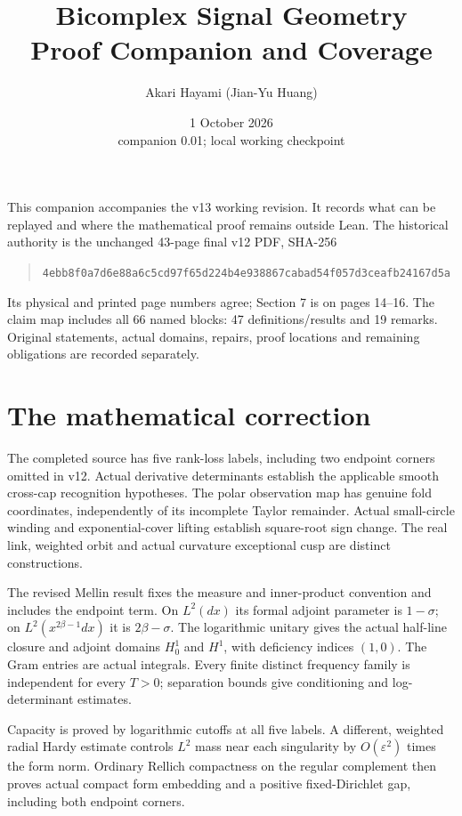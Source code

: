 \documentclass[11pt]{article}
\title{Bicomplex Signal Geometry\\Proof Companion and Coverage}
\author{Akari Hayami (Jian-Yu Huang)}
\date{1 October 2026\\\small companion 0.01; local working checkpoint}
\begin{document}
\maketitle

This companion accompanies the v13 working revision. It records what can be
replayed and where the mathematical proof remains outside Lean. The historical
authority is the unchanged 43-page final v12 PDF, SHA-256
\begin{quote}\small
\nolinkurl{4ebb8f0a7d6e88a6c5cd97f65d224b4e938867cabad54f057d3ceafb24167d5a}
\end{quote}
Its physical and printed page numbers agree; Section 7 is on pages 14--16.
The claim map includes all 66 named blocks: 47 definitions/results and 19
remarks. Original statements, actual domains, repairs, proof locations and
remaining obligations are recorded separately.

\section{The mathematical correction}
The completed source has five rank-loss labels, including two endpoint
corners omitted in v12. Actual derivative determinants establish the
applicable smooth cross-cap recognition hypotheses. The polar observation
map has genuine fold coordinates, independently of its incomplete Taylor
remainder. Actual small-circle winding and exponential-cover lifting establish
square-root sign change. The real link, weighted orbit and actual curvature
exceptional cusp are distinct constructions.

The revised Mellin result fixes the measure and inner-product convention and
includes the endpoint term. On $L^2(dx)$ its formal adjoint parameter is
$1-\sigma$; on $L^2(x^{2\beta-1}dx)$ it is $2\beta-\sigma$.
The logarithmic unitary gives the actual half-line closure and adjoint
domains $H^1_0$ and $H^1$, with deficiency indices $(1,0)$.
The Gram entries are actual integrals. Every finite distinct frequency family
is independent for every $T>0$; separation bounds give conditioning and
log-determinant estimates.

Capacity is proved by logarithmic cutoffs at all five labels. A different,
weighted radial Hardy estimate controls $L^2$ mass near each singularity by
$O(\varepsilon^2)$ times the form norm. Ordinary Rellich compactness on the
regular complement then proves actual compact form embedding and a positive
fixed-Dirichlet gap, including both endpoint corners.
\end{document}
